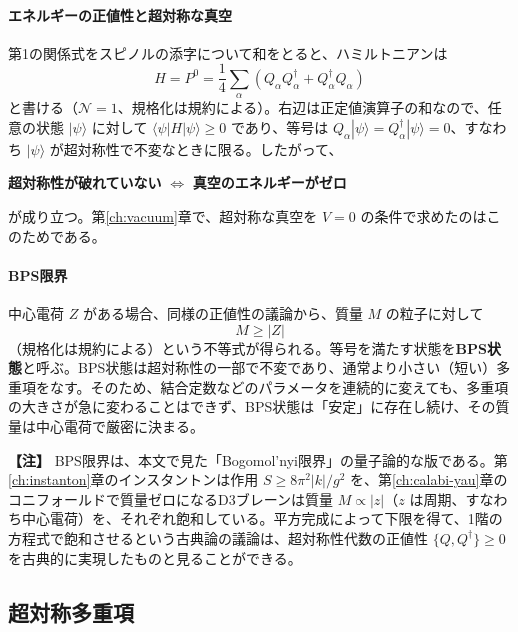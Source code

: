 \documentclass[uplatex, dvipdfmx, book]{jsbook}
\let\origsubsection\subsection
\let\origsubsubsection\subsubsection
\renewcommand{\section}{\origsubsection}
\renewcommand{\subsection}{\origsubsubsection}
\renewcommand{\subsubsection}{\paragraph}
\newenvironment{note}{\vspace{1ex}\par\footnotesize\noindent\textbf{【注】}}{\par\vspace{1ex}}
\begin{document}
\paragraph{エネルギーの正値性と超対称な真空}
第1の関係式をスピノルの添字について和をとると、ハミルトニアンは
\begin{equation}
    H = P^0 = \frac{1}{4}\sum_{\alpha} \left( Q_\alpha Q_\alpha^\dagger + Q_\alpha^\dagger Q_\alpha \right)
\end{equation}
と書ける（$\mathcal{N} = 1$、規格化は規約による）。右辺は正定値演算子の和なので、任意の状態 $|\psi\rangle$ に対して $\langle\psi|H|\psi\rangle \ge 0$ であり、等号は $Q_\alpha|\psi\rangle = Q^\dagger_\alpha|\psi\rangle = 0$、すなわち $|\psi\rangle$ が超対称性で不変なときに限る。したがって、
\begin{center}
    \textbf{超対称性が破れていない} $\iff$ \textbf{真空のエネルギーがゼロ}
\end{center}
が成り立つ。第\ref{ch:vacuum}章で、超対称な真空を $V = 0$ の条件で求めたのはこのためである。

\paragraph{BPS限界}
中心電荷 $Z$ がある場合、同様の正値性の議論から、質量 $M$ の粒子に対して
\begin{equation}
    M \ge |Z|
\end{equation}
（規格化は規約による）という不等式が得られる。等号を満たす状態を\textbf{BPS状態}と呼ぶ。BPS状態は超対称性の一部で不変であり、通常より小さい（短い）多重項をなす。そのため、結合定数などのパラメータを連続的に変えても、多重項の大きさが急に変わることはできず、BPS状態は「安定」に存在し続け、その質量は中心電荷で厳密に決まる。

\begin{note}
BPS限界は、本文で見た「Bogomol'nyi限界」の量子論的な版である。第\ref{ch:instanton}章のインスタントンは作用 $S \ge 8\pi^2|k|/g^2$ を、第\ref{ch:calabi-yau}章のコニフォールドで質量ゼロになるD3ブレーンは質量 $M \propto |z|$（$z$ は周期、すなわち中心電荷）を、それぞれ飽和している。平方完成によって下限を得て、1階の方程式で飽和させるという古典論の議論は、超対称性代数の正値性 $\{Q, Q^\dagger\} \ge 0$ を古典的に実現したものと見ることができる。
\end{note}

\section{超対称多重項}
\end{document}
